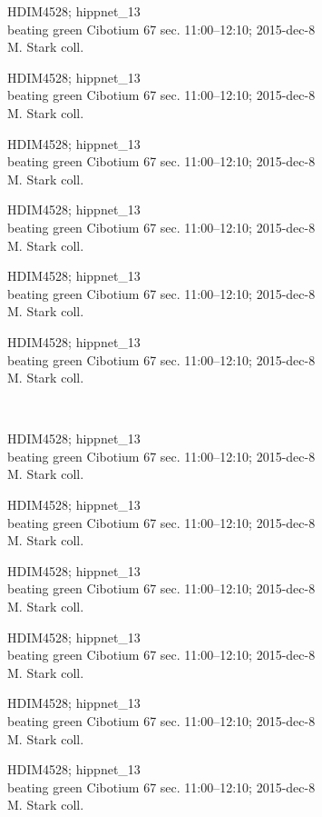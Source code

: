 \documentclass[2pt]{extarticle}
\begin{document}
\noindent
\parbox{0.16\textwidth}{\tiny \raggedright \rule[-0.3\baselineskip]{0pt}{10pt}HDIM4528; hippnet\_13\\ beating green Cibotium 67 sec. 11:00--12:10; 2015-dec-8\\ M. Stark coll.}
\parbox{0.16\textwidth}{\tiny \raggedright \rule[-0.3\baselineskip]{0pt}{10pt}HDIM4528; hippnet\_13\\ beating green Cibotium 67 sec. 11:00--12:10; 2015-dec-8\\ M. Stark coll.}
\parbox{0.16\textwidth}{\tiny \raggedright \rule[-0.3\baselineskip]{0pt}{10pt}HDIM4528; hippnet\_13\\ beating green Cibotium 67 sec. 11:00--12:10; 2015-dec-8\\ M. Stark coll.}
\parbox{0.16\textwidth}{\tiny \raggedright \rule[-0.3\baselineskip]{0pt}{10pt}HDIM4528; hippnet\_13\\ beating green Cibotium 67 sec. 11:00--12:10; 2015-dec-8\\ M. Stark coll.}
\parbox{0.16\textwidth}{\tiny \raggedright \rule[-0.3\baselineskip]{0pt}{10pt}HDIM4528; hippnet\_13\\ beating green Cibotium 67 sec. 11:00--12:10; 2015-dec-8\\ M. Stark coll.}
\parbox{0.16\textwidth}{\tiny \raggedright \rule[-0.3\baselineskip]{0pt}{10pt}HDIM4528; hippnet\_13\\ beating green Cibotium 67 sec. 11:00--12:10; 2015-dec-8\\ M. Stark coll.} \\ 
\vspace{0.001in} 

\noindent
\parbox{0.16\textwidth}{\tiny \raggedright \rule[-0.3\baselineskip]{0pt}{10pt}HDIM4528; hippnet\_13\\ beating green Cibotium 67 sec. 11:00--12:10; 2015-dec-8\\ M. Stark coll.}
\parbox{0.16\textwidth}{\tiny \raggedright \rule[-0.3\baselineskip]{0pt}{10pt}HDIM4528; hippnet\_13\\ beating green Cibotium 67 sec. 11:00--12:10; 2015-dec-8\\ M. Stark coll.}
\parbox{0.16\textwidth}{\tiny \raggedright \rule[-0.3\baselineskip]{0pt}{10pt}HDIM4528; hippnet\_13\\ beating green Cibotium 67 sec. 11:00--12:10; 2015-dec-8\\ M. Stark coll.}
\parbox{0.16\textwidth}{\tiny \raggedright \rule[-0.3\baselineskip]{0pt}{10pt}HDIM4528; hippnet\_13\\ beating green Cibotium 67 sec. 11:00--12:10; 2015-dec-8\\ M. Stark coll.}
\parbox{0.16\textwidth}{\tiny \raggedright \rule[-0.3\baselineskip]{0pt}{10pt}HDIM4528; hippnet\_13\\ beating green Cibotium 67 sec. 11:00--12:10; 2015-dec-8\\ M. Stark coll.}
\parbox{0.16\textwidth}{\tiny \raggedright \rule[-0.3\baselineskip]{0pt}{10pt}HDIM4528; hippnet\_13\\ beating green Cibotium 67 sec. 11:00--12:10; 2015-dec-8\\ M. Stark coll.} \\ 
\vspace{0.001in} 
\end{document}
